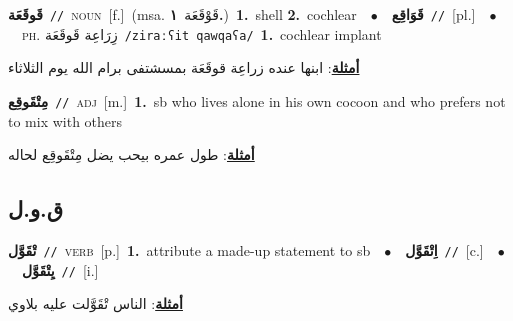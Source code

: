 \documentclass[10pt,a4paper,twoside]{article} %
\begin{document}
\begin{multicols}{2}
{\setlength\topsep{0pt}\textbf{\foreignlanguage{arabic}{قَوقَعَة}}\ {\color{gray}\texttt{//}\color{black}}\ \textsc{noun}\ [f.]\ \color{gray}(msa. \foreignlanguage{arabic}{قَوْقَعَة}~\foreignlanguage{arabic}{\textbf{١.}})\color{black}\ \textbf{1.}~shell  \textbf{2.}~cochlear\ \ $\bullet$\ \ \setlength\topsep{0pt}\textbf{\foreignlanguage{arabic}{قَوَاقِع}}\ {\color{gray}\texttt{//}\color{black}}\ [pl.]\ \ $\bullet$\ \ \textsc{ph.} \color{gray} \foreignlanguage{arabic}{زِرَاعِة قَوقَعَة}\color{black}\ {\color{gray}\texttt{/{\sffamily ziraːʕit qawqaʕa}/}\color{black}}\ \textbf{1.}~cochlear implant\  \begin{flushright}\color{gray}\foreignlanguage{arabic}{\textbf{\underline{\foreignlanguage{arabic}{أمثلة}}}: ابنها عنده زراعِة قوقَعَة بمسشتفى برام الله يوم الثلاثاء}\end{flushright}\color{black}} \vspace{2mm}

{\setlength\topsep{0pt}\textbf{\foreignlanguage{arabic}{مِتْقَوقِع}}\ {\color{gray}\texttt{//}\color{black}}\ \textsc{adj}\ [m.]\ \textbf{1.}~sb who lives alone in his own cocoon and who prefers not to mix with others\  \begin{flushright}\color{gray}\foreignlanguage{arabic}{\textbf{\underline{\foreignlanguage{arabic}{أمثلة}}}: طول عمره بيحب يضل مِتْقَوقِع لحاله}\end{flushright}\color{black}} \vspace{2mm}

\vspace{-3mm}
\subsection*{\color{blue}\foreignlanguage{arabic}{ق.و.ل}\color{blue}{}} 

{\setlength\topsep{0pt}\textbf{\foreignlanguage{arabic}{تْقَوَّل}}\ {\color{gray}\texttt{//}\color{black}}\ \textsc{verb}\ [p.]\ \textbf{1.}~attribute a made-up statement to sb\ \ $\bullet$\ \ \setlength\topsep{0pt}\textbf{\foreignlanguage{arabic}{اِتْقَوَّل}}\ {\color{gray}\texttt{//}\color{black}}\ [c.]\ \ $\bullet$\ \ \setlength\topsep{0pt}\textbf{\foreignlanguage{arabic}{يِتْقَوَّل}}\ {\color{gray}\texttt{//}\color{black}}\ [i.]\  \begin{flushright}\color{gray}\foreignlanguage{arabic}{\textbf{\underline{\foreignlanguage{arabic}{أمثلة}}}: الناس تْقَوَّلت عليه بلاوي}\end{flushright}\color{black}} \vspace{2mm}


\end{multicols}
\end{document}
